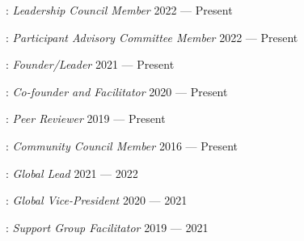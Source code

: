 : \textit{Leadership Council Member}
\hfill 2022 --- Present

: \textit{Participant Advisory Committee Member}
\hfill 2022 --- Present

: \textit{Founder/Leader} \hfill 2021 --- Present

: \textit{Co-founder and Facilitator}
\hfill 2020 --- Present

: \textit{Peer Reviewer} \hfill 2019 --- Present

:
\textit{Community Council Member} \hfill 2016 --- Present

: \textit{Global Lead}
\hfill 2021 --- 2022

: \textit{Global Vice-President}
\hfill 2020 --- 2021

: \textit{Support Group Facilitator}
\hfill 2019 --- 2021

